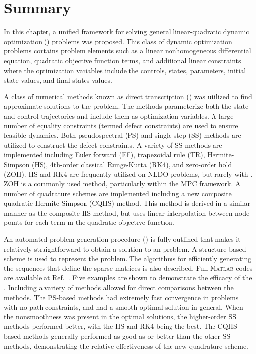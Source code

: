 \section{Summary} \label{sec:ch5:conclusion}

In this chapter, a unified framework for solving general linear-quadratic dynamic optimization (\lqdo{}) problems was proposed.
This class of dynamic optimization problems contains problem elements such as a linear nonhomogeneous differential equation, quadratic objective function terms, and additional linear constraints where the optimization variables include the controls, states, parameters, initial state values, and final states values.

A class of numerical methods known as direct transcription (\dt) was utilized to find approximate solutions to the \lqdo{} problem.
The \dt{} methods parameterize both the state and control trajectories and include them as optimization variables. 
A large number of equality constraints (termed defect constraints) are used to ensure feasible dynamics.
Both pseudospectral (PS) and single-step (SS) methods are utilized to construct the defect constraints.
A variety of SS methods are implemented including Euler forward (EF), trapezoidal rule (TR), Hermite-Simpson (HS),  4th-order classical Runge-Kutta (RK4), and zero-order hold (ZOH).
HS and RK4 are frequently utilized on NLDO problems, but rarely with \lqdo{}.
ZOH is a commonly used method, particularly within the MPC framework.
A number of quadrature schemes are implemented including a new composite quadratic Hermite-Simpson (CQHS) method.
This method is derived in a similar manner as the composite HS method, but uses linear interpolation between node points for each term in the quadratic objective function.

An automated problem generation procedure (\apgp) is fully outlined that makes it relatively straightforward to obtain a \dt{} solution to an \lqdo{} problem.
A structure-based scheme is used to represent the problem.
The algorithms for efficiently generating the sequences that define the sparse matrices is also described.
Full \textsc{Matlab} codes are available at Ref.~\cite{github-dt-qp-project}.
Five examples are shown to demonstrate the efficacy of the \apgp.
Including a variety of \dt{} methods allowed for direct comparisons between the methods.
The PS-based methods had extremely fast convergence in problems with no path constraints, and had a smooth optimal solution in general.
When the nonsmoothness was present in the optimal solutions, the higher-order SS methods performed better, with the HS and RK4 being the best.
The CQHS-based methods generally performed as good as or better than the other SS methods, demonstrating the relative effectiveness of the new quadrature scheme.


